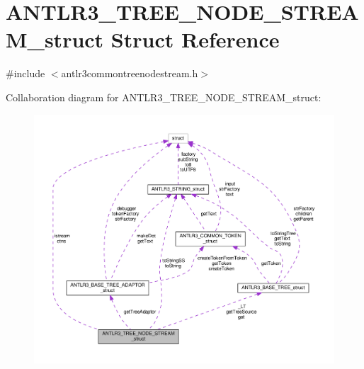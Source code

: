 \hypertarget{struct_a_n_t_l_r3___t_r_e_e___n_o_d_e___s_t_r_e_a_m__struct}{\section{A\-N\-T\-L\-R3\-\_\-\-T\-R\-E\-E\-\_\-\-N\-O\-D\-E\-\_\-\-S\-T\-R\-E\-A\-M\-\_\-struct Struct Reference}
\label{struct_a_n_t_l_r3___t_r_e_e___n_o_d_e___s_t_r_e_a_m__struct}
}


{\ttfamily \#include $<$antlr3commontreenodestream.\-h$>$}



Collaboration diagram for A\-N\-T\-L\-R3\-\_\-\-T\-R\-E\-E\-\_\-\-N\-O\-D\-E\-\_\-\-S\-T\-R\-E\-A\-M\-\_\-struct\-:
\nopagebreak
\begin{figure}[H]
\begin{center}
\leavevmode
\includegraphics[width=350pt]{struct_a_n_t_l_r3___t_r_e_e___n_o_d_e___s_t_r_e_a_m__struct__coll__graph}
\end{center}
\end{figure}
